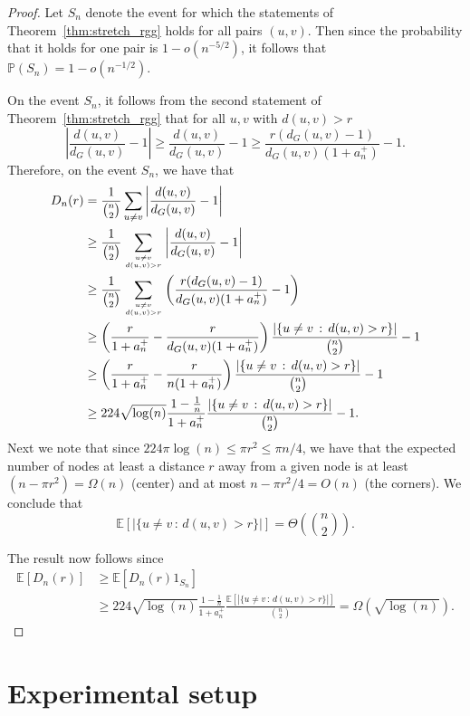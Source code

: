 \documentclass{article} %
\begin{document}
\begin{proof}
Let $S_n$ denote the event for which the statements of Theorem~\ref{thm:stretch_rgg} holds for all pairs $(u,v)$. Then since the probability that it holds for one pair is $1 - o(n^{-5/2})$, it follows that $\mathbb{P}(S_n) = 1 - o(n^{-1/2})$.

On the event $S_n$, it follows from the second statement of Theorem~\ref{thm:stretch_rgg} that for all $u,v$ with $d(u,v) > r$
\[
	\left|\frac{d(u,v)}{d_G(u,v)} - 1\right| \ge \frac{d(u,v)}{d_G(u,v)} - 1
	\ge \frac{r(d_G(u,v) - 1)}{d_G(u,v)(1+a_n^+)} - 1.
\]
Therefore, on the event $S_n$, we have that
\begin{align*}
	D_n(r) &= \frac{1}{\binom{n}{2}} \sum_{u \ne v} \left|\frac{d(u,v)}{d_G(u,v)} - 1\right|\\
	&\ge \frac{1}{\binom{n}{2}} \sum_{u \ne v \atop d(u,v) > r} \left|\frac{d(u,v)}{d_G(u,v)} - 1\right|\\
	&\ge \frac{1}{\binom{n}{2}} \sum_{u \ne v \atop d(u,v) > r} \left(\frac{r(d_G(u,v) - 1)}{d_G(u,v)(1+a_n^+)} - 1\right)\\
	&\ge \left(\frac{r}{1 + a_n^+} - \frac{r}{d_G(u,v)(1+a_n^+)}\right) 
		\frac{|\{u \ne v \, :\, d(u,v) > r\}|}{\binom{n}{2}} - 1\\
	&\ge \left(\frac{r}{1 + a_n^+} - \frac{r}{n(1+a_n^+)}\right) 
			\frac{|\{u \ne v \, :\, d(u,v) > r\}|}{\binom{n}{2}} - 1\\
	&\ge 224 \sqrt{\log(n)} \frac{1 - \frac{1}{n}}{1 + a_n^+} \frac{|\{u \ne v \, :\, d(u,v) > r\}|}{\binom{n}{2}} - 1.
\end{align*}
Next we note that since $224 \pi \log(n) \le \pi r^2 \le \pi n/4$, we have that the expected number of nodes at least a distance $r$ away from a given node is at least $(n - \pi r^2) = \Omega(n)$ (center) and at most $n - \pi r^2/4 = O(n)$ (the corners). We conclude that
\[
	\mathbb{E}[|\{u \ne v \, :\, d(u,v) > r\}|] = \Theta\left(\binom{n}{2}\right).
\]

The result now follows since
\begin{align*}
	\mathbb{E}[D_n(r)] &\ge \mathbb{E}[D_n(r) 1_{S_n}] \\
	&\ge 224 \sqrt{\log(n)} \frac{1 - \frac{1}{n}}{1 + a_n^+} 
		\frac{\mathbb{E}[|\{u \ne v \, :\, d(u,v) > r\}|]}{\binom{n}{2}}
		= \Omega(\sqrt{\log(n)}).
\end{align*}
\end{proof}


\section{Experimental setup}
\end{document}
